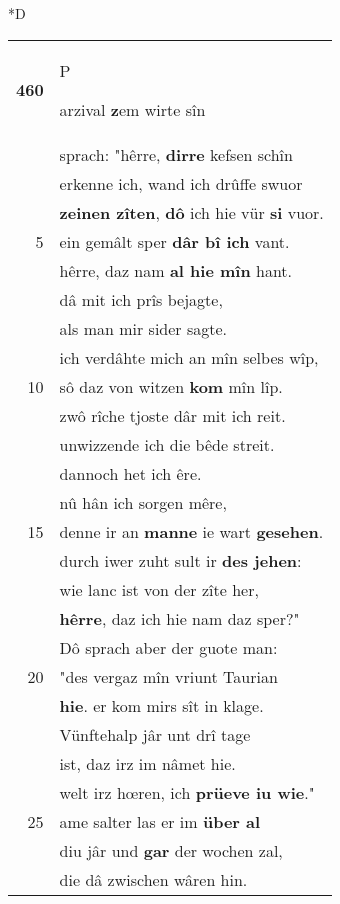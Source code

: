 \documentclass[8pt,a4paper,notitlepage]{article}
\begin{document}
\begin{table}[ht]
\begin{minipage}[t]{0.5\linewidth}
\small
\begin{center}*D
\end{center}
\begin{tabular}{rl}
\textbf{460} & \begin{large}P\end{large}arzival \textbf{z}em wirte sîn\\ 
 & sprach: "hêrre, \textbf{dirre} kefsen schîn\\ 
 & erkenne ich, wand ich drûffe swuor\\ 
 & \textbf{zeinen zîten}, \textbf{dô} ich hie vür \textbf{si} vuor.\\ 
5 & ein gemâlt sper \textbf{dâr bî ich} vant.\\ 
 & hêrre, daz nam \textbf{al hie mîn} hant.\\ 
 & dâ mit ich prîs bejagte,\\ 
 & als man mir sider sagte.\\ 
 & ich verdâhte mich an mîn selbes wîp,\\ 
10 & sô daz von witzen \textbf{kom} mîn lîp.\\ 
 & zwô rîche tjoste dâr mit ich reit.\\ 
 & unwizzende ich die bêde streit.\\ 
 & dannoch het ich êre.\\ 
 & nû hân ich sorgen mêre,\\ 
15 & denne ir an \textbf{manne} ie wart \textbf{gesehen}.\\ 
 & durch iwer zuht sult ir \textbf{des jehen}:\\ 
 & wie lanc ist von der zîte her,\\ 
 & \textbf{hêrre}, daz ich hie nam daz sper?"\\ 
 & Dô sprach aber der guote man:\\ 
20 & "des vergaz mîn vriunt Taurian\\ 
 & \textbf{hie}. er kom mirs sît in klage.\\ 
 & Vünftehalp jâr unt drî tage\\ 
 & ist, daz irz im nâmet hie.\\ 
 & welt irz hœren, ich \textbf{prüeve iu wie}."\\ 
25 & ame salter las er im \textbf{über al}\\ 
 & diu jâr und \textbf{gar} der wochen zal,\\ 
 & die dâ zwischen wâren hin.\\ 

\end{tabular}
\end{minipage}
\end{table}
\end{document}
